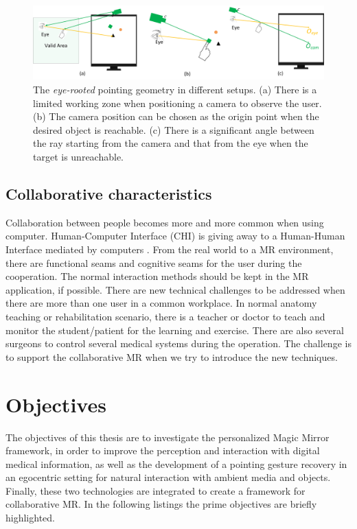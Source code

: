 \begin{figure} [htb]
	\centering
	\includegraphics[width= \linewidth]{figures/4-PAST/problem}
	\caption{The \textit{eye-rooted} pointing geometry in different setups. (a) There is a limited working zone when positioning a camera to observe the user. (b) The camera position can be chosen as the origin point when the desired object is reachable. (c) There is a significant angle between the ray starting from the camera and that from the eye when the target is unreachable.}
	\label{fig:1-intro:problem}
\end{figure}

\subsection{Collaborative characteristics}
Collaboration between people becomes more and more common when using computer. Human-Computer Interface (CHI) is giving away to a Human-Human Interface mediated by computers \cite{Billinghurst1999}. From the real world to a MR environment, there are functional seams and cognitive seams for the user during the cooperation. The normal interaction methods should be kept in the MR application, if possible.
There are new technical challenges to be addressed when there are more than one user in a common workplace.
In normal anatomy teaching or rehabilitation scenario, there is a teacher or doctor to teach and monitor the student/patient for the learning and exercise. There are also several surgeons to control several medical systems during the operation. The challenge is to support the collaborative MR when we try to introduce the new techniques.

\section{Objectives}
The objectives of this thesis are to investigate the personalized Magic Mirror framework, in order to improve the perception and interaction with digital medical information, as well as the development of a pointing gesture recovery in an egocentric setting for natural interaction with ambient media and objects. Finally, these two technologies are integrated to create a framework for collaborative MR.
In the following listings the prime objectives are briefly highlighted.

